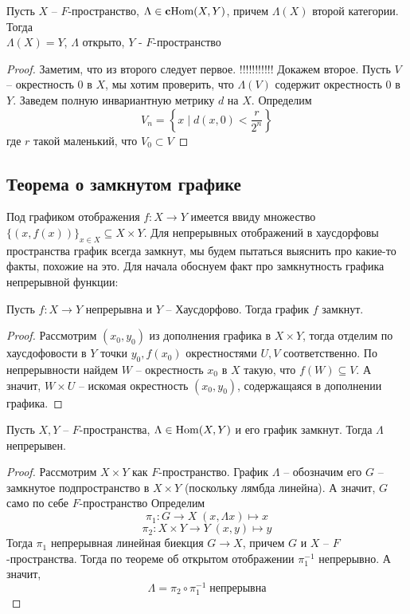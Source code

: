 \documentclass[12pt, a4paper, oneside]{book}
\begin{document}
\begin{theorem}
   Пусть $X$ -- $F$-пространство, $\Lambda \in \text{\textbf{c}Hom}(X,Y)$, причем $\Lambda(X)$ второй категории. Тогда\\
     $\Lambda(X) = Y$, \; \; $\Lambda$ открыто,\; \; $Y$ - $F$-пространство
\end{theorem}
\begin{proof}
Заметим, что из второго следует первое. !!!!!!!!!!! Докажем второе.
    Пусть $V$ -- окрестность 0 в $X$, мы хотим проверить, что $\Lambda(V)$ содержит окрестность 0 в $Y$. Заведем полную инвариантную метрику $d$ на $X$.
    Определим $$V_n = \left\{x\; | \; d(x,0) < \frac{r}{2^n}\right\}$$
    где $r$ такой маленький, что $V_0 \subset V$
\end{proof}


\subsection{Теорема о замкнутом графике}
Под графиком отображения $f: X \to Y$ имеется ввиду множество $\{(x,f(x))\}_{x \in X} \subseteq X \times Y$. Для непрерывных отображений в хаусдорфовы пространства график всегда замкнут, мы будем пытаться выяснить про какие-то факты, похожие на это.
Для начала обоснуем факт про замкнутность графика непрерывной функции:
\begin{remark}
Пусть $f:X \to Y$ непрерывна и $Y$ -- Хаусдорфово. Тогда график $f$ замкнут.
\end{remark}
\begin{proof}
Рассмотрим $(x_0, y_0)$ из дополнения графика в $X \times Y$, тогда отделим по хаусдофовости в $Y$ точки $y_0, f(x_0)$ окрестностями $U, V$ соответственно.
По непрерывности найдем $W$ -- окрестность $x_0$ в $X$ такую, что $f(W) \subseteq V$. А значит, $W \times U$ -- искомая окрестность $(x_0, y_0)$, содержащаяся в дополнении графика.
\end{proof}

\begin{theorem}
    Пусть $X,Y$ -- $F$-пространства, $\Lambda \in \operatorname{Hom}(X,Y)$ и его график замкнут. Тогда $\Lambda$ непрерывен.
\end{theorem}

\begin{proof}
    Рассмотрим $X\times Y$ как $F$-пространство.
График $\Lambda$ -- обозначим его $G$ -- замкнутое подпространство в $X\times Y$ (поскольку лямбда линейна). А значит, $G$ само по себе $F$-пространство
    Определим $$\pi_1: G \to X\; (x,\Lambda x) \mapsto x$$
    $$\pi_2: X\times Y \to Y\; (x,y) \mapsto y$$
    Тогда $\pi_1$ непрерывная линейная биекция $G\to X$, причем $G$ и $X$ -- $F$-пространства. Тогда по теореме об открытом отображении $\pi_1^{-1}$ непрерывно. А значит,
     $$\Lambda = \pi_2 \circ \pi_1^{-1} \; \text{непрерывна}$$
\end{proof}
\end{document}
